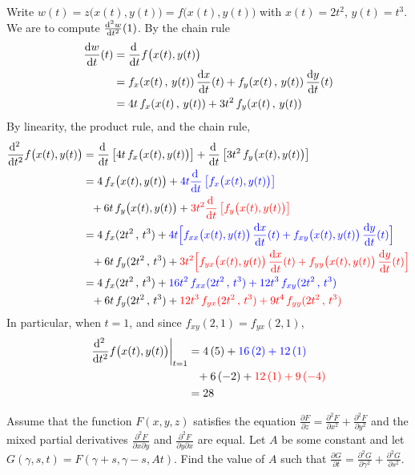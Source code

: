 \begin{solution}
Write $w(t) = z\big(x(t),y(t)\big) = f\big(x(t),y(t)\big)$ with
$x(t)=2t^2$, $y(t)=t^3$.
We are to compute $\difftwo{w}{t}(1)$.
By the chain rule
\begin{align*}
\diff{w}{t}(t)&= \diff{}{t} f\big(x(t),y(t)\big) \\
  &= f_x(x(t)\,,\,y(t))\,\diff{x}{t}(t)
                     +f_y(x(t)\,,\,y(t))\,\diff{y}{t}(t) \\
  &= 4t\,f_x(x(t)\,,\,y(t))
                     +3t^2\,f_y(x(t)\,,\,y(t)) 
\end{align*}
By linearity, the product rule, and the chain rule,
\begin{align*}
\difftwo{}{t} f\big(x(t),y(t)\big) 
&= \diff{}{t}\left[4t\,f_x\big(x(t),y(t)\big) \right]
   +\diff{}{t}\left[3t^2\,f_y\big(x(t),y(t)\big) \right] \\
&= 4\,f_x\big(x(t),y(t)\big)  
   + \textcolor{blue}{4t \diff{}{t}\left[f_x\big(x(t),y(t)\big) \right] }
         \\&\hskip0.1in
   +6t\,f_y\big(x(t),y(t)\big) 
   +\textcolor{red}{3t^2\diff{}{t}\left[f_y\big(x(t),y(t)\big) \right]} \\
&= 4\,f_x(2t^2\,,\,t^3) 
          + \textcolor{blue}{4t\Big[f_{xx}\big(x(t),y(t)\big)\,\diff{x}{t}(t)
          + f_{xy}\big(x(t),y(t)\big)\,\diff{y}{t}(t)\Big]} \\
&\phantom{=} + 6t\,f_y(2t^2\,,\,t^3) 
          + \textcolor{red}{3t^2\Big[f_{yx}\big(x(t),y(t)\big)\,\diff{x}{t}(t) 
          + f_{yy}\big(x(t),y(t)\big)\,\diff{y}{t}(t)\Big]} \\
&= 4\,f_x(2t^2\,,\,t^3) 
          + \textcolor{blue}{16t^2\,f_{xx}(2t^2\,,\,t^3)
          + 12t^3\,f_{xy}(2t^2\,,\,t^3)} \\
&\phantom{=} + 6t\,f_y(2t^2\,,\,t^3) 
          + \textcolor{red}{12t^3\,f_{yx}(2t^2\,,\,t^3) 
          + 9t^4\,f_{yy}(2t^2\,,\,t^3)} 
\end{align*}
In particular, when $t=1$, and since $f_{xy}(2, 1)=f_{yx}(2, 1)$,
\begin{align*}
\left.\difftwo{}{t} f\big(x(t),y(t)\big) \right|_{t=1}
&= 4\,(5) 
          +\textcolor{blue}{ 16\,(2)
          + 12\,(1)} \\
&\phantom{=} + 6\,(-2) 
          + \textcolor{red}{12\,(1)
          + 9\,(-4)} \\
&=28 
\end{align*}
\end{solution}

\begin{question}[M200 2012D] %
Assume that the function $F(x,y,z)$ satisfies the equation
$\frac{\partial F}{\partial z} = \frac{\partial^2 F}{\partial x^2}
+ \frac{\partial^2 F}{\partial y^2}$ and the mixed partial derivatives
$\frac{\partial^2 F}{\partial x \partial y}$ and
$\frac{\partial^2 F}{\partial y \partial x}$ are equal. Let $A$ be some 
constant and let $G(\gamma, s, t) = F (\gamma + s, \gamma-s, At)$. 
Find the value of $A$ such that
$\frac{\partial G}{\partial t} = \frac{\partial^2 G}{\partial \gamma^2}
+ \frac{\partial^2 G}{\partial s^2}$.
\end{question}

